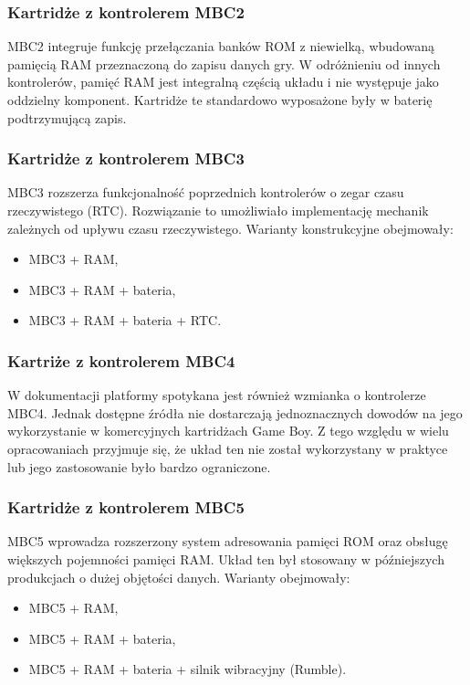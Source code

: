 \documentclass{article}
\begin{document}
\subsubsection{Kartridże z kontrolerem MBC2}

MBC2 integruje funkcję przełączania banków ROM z niewielką, wbudowaną pamięcią RAM przeznaczoną do zapisu danych gry. W odróżnieniu od innych kontrolerów, pamięć RAM jest integralną częścią układu i nie występuje jako oddzielny komponent. Kartridże te standardowo wyposażone były w baterię podtrzymującą zapis.

\subsubsection{Kartridże z kontrolerem MBC3}

MBC3 rozszerza funkcjonalność poprzednich kontrolerów o zegar czasu rzeczywistego (RTC). Rozwiązanie to umożliwiało implementację mechanik zależnych od upływu czasu rzeczywistego. Warianty konstrukcyjne obejmowały:

\begin{itemize}
	\item MBC3 + RAM,
	\item MBC3 + RAM + bateria,
	\item MBC3 + RAM + bateria + RTC.
\end{itemize}
\subsubsection{Kartriże z kontrolerem MBC4}
W dokumentacji platformy spotykana jest również wzmianka o kontrolerze MBC4. Jednak dostępne źródła nie dostarczają jednoznacznych dowodów na jego wykorzystanie w komercyjnych kartridżach Game Boy. Z tego względu w wielu opracowaniach przyjmuje się, że układ ten nie został wykorzystany w praktyce lub jego zastosowanie było bardzo ograniczone.
\subsubsection{Kartridże z kontrolerem MBC5}

MBC5 wprowadza rozszerzony system adresowania pamięci ROM oraz obsługę większych pojemności pamięci RAM. Układ ten był stosowany w późniejszych produkcjach o dużej objętości danych. Warianty obejmowały:

\begin{itemize}
	\item MBC5 + RAM,
	\item MBC5 + RAM + bateria,
	\item MBC5 + RAM + bateria + silnik wibracyjny (Rumble).
\end{itemize}
\end{document}
